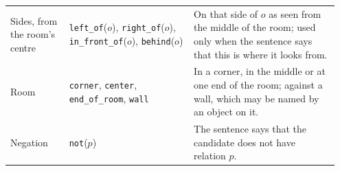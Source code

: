 \begin{table}[t]
\begin{tabular}{@{}p{0.17\linewidth}p{0.36\linewidth}p{0.42\linewidth}@{}}
\addlinespace
Sides, from the room's centre & \texttt{left\_of}($o$), \texttt{right\_of}($o$), \texttt{in\_front\_of}($o$), \texttt{behind}($o$) & On that side of $o$ as seen from the middle of the room; used only when the sentence says that this is where it looks from. \\
\addlinespace
Room & \texttt{corner}, \texttt{center}, \texttt{end\_of\_room}, \texttt{wall} & In a corner, in the middle or at one end of the room; against a wall, which may be named by an object on it. \\
\addlinespace
Negation & \texttt{not}($p$) & The sentence says that the candidate does not have relation $p$. \\
\bottomrule
\end{tabular}
\end{table}

